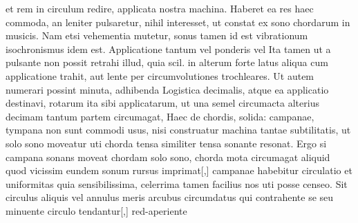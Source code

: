 {} et rem in circulum redire, applicata nostra  machina.  Haberet ea res haec commoda,  an leniter pulsaretur, nihil interesset, ut constat ex sono\protect{} chordarum  in musicis. Nam etsi vehementia mutetur, sonus\protect{} tamen id est vibrationum isochronismus idem est. Applicatione tantum vel ponderis vel %
{} Ita  tamen ut a pulsante non possit retrahi illud, quia scil.  in alterum forte latus aliqua cum applicatione trahit,  aut lente per circumvolutiones trochleares\protect{}. Ut autem  numerari possint minuta, adhibenda Logistica decimalis,  atque ea applicatio destinavi, rotarum ita sibi applicatarum, ut una semel circumacta alterius  decimam tantum partem circumagat, %
{} Haec  de chordis, solida: campanae\protect{}, tympana\protect{} non sunt commodi usus,  nisi construatur machina tantae subtilitatis, ut solo sono\protect{} moveatur  uti chorda tensa  similiter tensa sonante resonat. Ergo  si campana\protect{} sonans moveat chordam solo sono\protect{}, chorda mota circumagat aliquid quod vicissim eundem sonum\protect{} rursus imprimat[,]
campanae\protect{} habebitur circulatio et uniformitas
%
{} quia sensibilissima, celerrima tamen facilius nos uti posse censeo. Sit circulus aliquis vel annulus  meris arcubus circumdatus qui contrahente se seu minuente  circulo tendantur[,] red-aperiente
